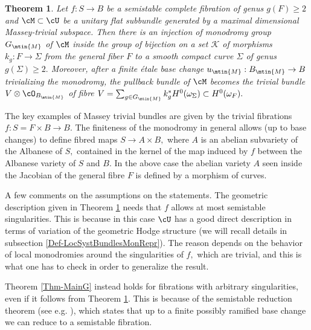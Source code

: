 \documentclass[a4paper,11pt]{amsart}
\newtheorem{theorem}{Theorem}[section]
\begin{document}
{\begin{theorem}\label{Thm-MainSbis} Let $f:S\to B$ be a semistable complete fibration of genus $g(F)\geq 2$ and $\cM\subset \cU$ be a unitary flat subbundle generated by a maximal dimensional Massey-trivial subspace. Then there is an injection of monodromy group $G_{\mtin{M}}$ of $\cM$ inside the group of bijection on a set $\mathscr{K}$ of morphisms $k_g:F\to \Sigma$ from the general fiber $F$ to a smooth compact curve $\Sigma$ of genus $g(\Sigma)\geq 2.$  Moreover, after a finite \'{e}tale base change $u_{\mtin{M}}:B_{\mtin{M}}\to B$ trivializing the monodromy, the pullback bundle of $\cM$ becomes the trivial bundle $V\otimes \cO_{B_{\mtin{M}}}$ of fibre $V=\sum_{g\in G_{\mtin{M}}} k_g^*H^0(\omega_{\Sigma})\subset H^0(\omega_F).$ 
\end{theorem}

The key examples of Massey trivial bundles are given by the trivial fibrations $f:S=F\times B\to B$. The finiteness of the monodromy in general allows (up to base changes) to define fibred maps $S\to A\times B,$ where $A$ is an abelian subvariety of the Albanese of $S,$ contained in the kernel of the map induced by $f$ between the Albanese variety of $S$ and $B.$ In the above case the abelian variety $A$ seen inside the Jacobian of the general fibre $F$ is defined by a morphism of curves.  

A few comments on the assumptions on the statements. The geometric description given in Theorem \ref{Thm-MainSbis} needs that $f$ allows at most semistable singularities. This is because in this case $\cU$ has a good direct description in terms of variation of the geometric Hodge structure (we will recall details in subsection \ref{Def-LocSystBundlesMonRepr}). The reason depends on the behavior of local monodromies around the singularities of $f,$ which are trivial, and this is what one has to check in order to generalize the result.   

Theorem \ref{Thm-MainG} instead holds for fibrations with arbitrary singularities, even if it follows from Theorem \ref{Thm-MainSbis}. This is because of the semistable reduction theorem (see e.g. \cite[Theorem 2.7]{CD:Answer_2017}), which states that up to a finite possibly ramified base change we can reduce to a semistable fibration.


}
\end{document}
